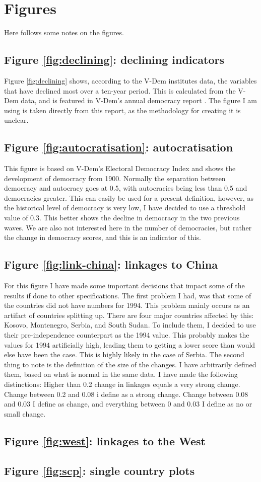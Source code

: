 \section{Figures}
Here follows some notes on the figures.

\subsection{Figure \ref{fig:declining}: declining indicators}
Figure \ref{fig:declining} shows, according to the V-Dem institutes data, the variables that have declined most over a ten-year period. This is calculated from the V-Dem data, and is featured in V-Dem's annual democracy report \citep[p. 17]{nord_democracy_2025}. The figure I am using is taken directly from this report, as the methodology for creating it is unclear.

\subsection{Figure \ref{fig:autocratisation}: autocratisation}
This figure is based on V-Dem's Electoral Democracy Index and shows the development of democracy from 1900. Normally the separation between democracy and autocracy goes at 0.5, with autocracies being less than 0.5 and democracies greater. This can easily be used for a present definition, however, as the historical level of democracy is very low, I have decided to use a threshold value of 0.3. This better shows the decline in democracy in the two previous waves. We are also not interested here in the number of democracies, but rather the change in democracy scores, and this is an indicator of this.

\subsection{Figure \ref{fig:link-china}: linkages to China}
For this figure I have made some important decisions that impact some of the results if done to other specifications. The first problem I had, was that some of the countries did not have numbers for 1994. This problem mainly occurs as an artifact of countries splitting up. There are four major countries affected by this: Kosovo, Montenegro, Serbia, and South Sudan. To include them, I decided to use their pre-independence counterpart as the 1994 value. This probably makes the values for 1994 artificially high, leading them to getting a lower score than would else have been the case. This is highly likely in the case of Serbia. The second thing to note is the definition of the size of the changes. I have arbitrarily defined them, based on what is normal in the same data. I have made the following distinctions: Higher than 0.2 change in linkages equals a very strong change. Change between 0.2 and 0.08 i define as a strong change. Change between 0.08 and 0.03 I define as change, and everything between 0 and 0.03 I define as no or small change. 

\subsection{Figure \ref{fig:west}: linkages to the West}

\subsection{Figure \ref{fig:scp}: single country plots}